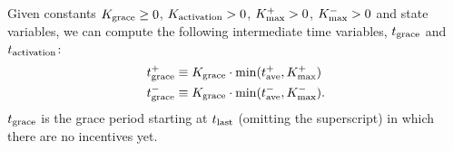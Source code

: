 \documentclass[9pt,oneside]{amsart}
\begin{document}
\begin{multicols}{2}
Given constants $K_\textnormal{grace} \geq 0$,
$K_\textnormal{activation} > 0$, $K^+_\textnormal{max}>0$, $K^-_\textnormal{max}>0$ and state variables, we can compute the following intermediate time variables, $t_\textnormal{grace}$ and $t_\textnormal{activation}$:
\begin{align}
t^+_\textnormal{grace} &\equiv 
 K_\textnormal{grace} \cdot \min(t^+_\textnormal{ave}, K^+_\textnormal{max})\\
t^-_\textnormal{grace} &\equiv K_\textnormal{grace} \cdot \min(t^-_\textnormal{ave}, K^-_\textnormal{max}).
\end{align}
$t_\textnormal{grace}$ is the grace period starting at $t_\textnormal{last}$ (omitting the superscript) in which there are no incentives yet.

\end{multicols}
\end{document}
